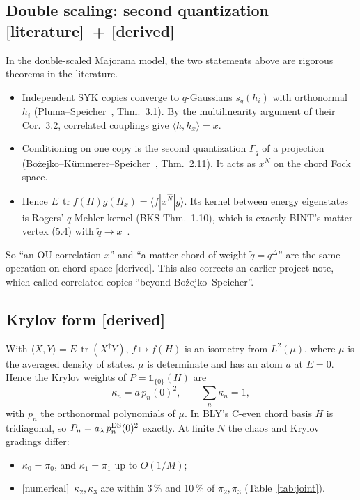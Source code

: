 \documentclass[11pt]{article}
\newcommand{\tr}{\operatorname{tr}}
\newcommand{\one}{\mathds 1}
\newcommand{\tagbox}[2]{\textsf{\small\color{#1}[#2]}}
\newcommand{\EST}{\tagbox{cest}{literature}}
\newcommand{\DER}{\tagbox{cder}{derived}}
\newcommand{\NUM}{\tagbox{cnum}{numerical}}
\theoremstyle{remark}
\begin{document}
\subsection{Double scaling: second quantization \EST\ + \DER}
In the double-scaled Majorana model, the two statements above are rigorous theorems in the literature.
\begin{itemize}\itemsep1pt
\item Independent SYK copies converge to $q$-Gaussians $s_q(h_i)$ with orthonormal $h_i$ (Pluma--Speicher~\cite{PS},
  Thm.~3.1). By the multilinearity argument of their Cor.~3.2, correlated couplings give $\langle h,h_x\rangle=x$.
\item Conditioning on one copy is the second quantization $\Gamma_q$ of a projection (Bożejko--Kümmerer--Speicher~\cite{BKS},
  Thm.~2.11). It acts as $x^{\hat N}$ on the chord Fock space.
\item Hence $E\,\tr f(H)g(H_x)=\langle f|x^{\hat N}|g\rangle$. Its kernel between energy eigenstates is Rogers' $q$-Mehler
  kernel (BKS Thm.~1.10), which is exactly BINT's matter vertex (5.4) with $\tilde q\to x$~\cite{BINT}.
\end{itemize}
So ``an OU correlation $x$'' and ``a matter chord of weight $\tilde q=q^\Delta$'' are the same operation on chord space
\DER. This also corrects an earlier project note, which called correlated copies ``beyond Bożejko--Speicher''.

\subsection{Krylov form \DER}
With $\langle X,Y\rangle=E\,\tr(X^\dagger Y)$, $f\mapsto f(H)$ is an isometry from $L^2(\mu)$, where $\mu$ is the averaged
density of states. $\mu$ is determinate and has an atom $a$ at $E=0$. Hence the Krylov weights of $P=\one_{\{0\}}(H)$ are
\begin{equation}
\kappa_n=a\,p_n(0)^2,\qquad \sum_n\kappa_n=1,
\end{equation}
with $p_n$ the orthonormal polynomials of $\mu$. In BLY's C-even chord basis $H$ is tridiagonal, so
$P_n=a_\lambda\,p_n^{\rm DS}(0)^2$ exactly. At finite $N$ the chaos and Krylov gradings differ:
\begin{itemize}\itemsep1pt
\item $\kappa_0=\pi_0$, and $\kappa_1=\pi_1$ up to $O(1/M)$;
\item \NUM\ $\kappa_2,\kappa_3$ are within 3\,\% and 10\,\% of $\pi_2,\pi_3$ (Table~\ref{tab:joint}).
\end{itemize}
\end{document}
